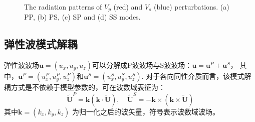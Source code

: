 \begin{figure}
\begin{center}
        \caption{The radiation patterns of $V_p$
        (red) and $V_s$ (blue) perturbations. (a) PP, (b) PS, (c) SP and (d) SS modes.
    }
    \label{fig:radiationpattern} 
    \end{center}
\end{figure} 

\subsection{弹性波模式解耦}
弹性波波场$\mathbf{u}=(u_x,u_y,u_z)$可以分解成P波波场与S波波场：$\mathbf{u}=\mathbf{u}^P+\mathbf{u}^S$，
其中，$\mathbf{u}^P=(u^P_x,u^P_y,u^P_z)$和$\mathbf{u}^S=(u^S_x,u^S_y,u^S_z)$.
对于各向同性介质而言，该模式解耦方式是不依赖于模型参数的，可在波数域表征为\cite[]{zhang.mcmechan:2010}：
\begin{equation}
        \tilde{\mathbf U}^P=\mathbf k(\mathbf k\cdot \tilde{\mathbf U}), \quad
        \tilde{\mathbf U}^S=-\mathbf 
        k\times(\mathbf k\times \tilde{\mathbf U})
\label{eq:Decomp}
\end{equation}
其中$\mathbf k=(k_x,k_y,k_z)$ 为归一化之后的波矢量，符号$\tilde{}$表示波数域波场。

